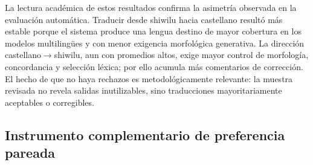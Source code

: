 \documentclass[12pt,a4paper,oneside]{book}
\begin{document}
\begin{table}[h]
\centering
\caption{Ejemplos representativos de correcciones en la validación participativa.}
\label{tab:validacion-humana-ejemplos}
\end{table}

La lectura académica de estos resultados confirma la asimetría observada en la evaluación automática. Traducir desde shiwilu hacia castellano resultó más estable porque el sistema produce una lengua destino de mayor cobertura en los modelos multilingües y con menor exigencia morfológica generativa. La dirección castellano\(\rightarrow\)shiwilu, aun con promedios altos, exige mayor control de morfología, concordancia y selección léxica; por ello acumula más comentarios de corrección. El hecho de que no haya rechazos es metodológicamente relevante: la muestra revisada no revela salidas inutilizables, sino traducciones mayoritariamente aceptables o corregibles.

\subsection{Instrumento complementario de preferencia pareada}\label{protocolo-preferencia-pareada}
\end{document}
